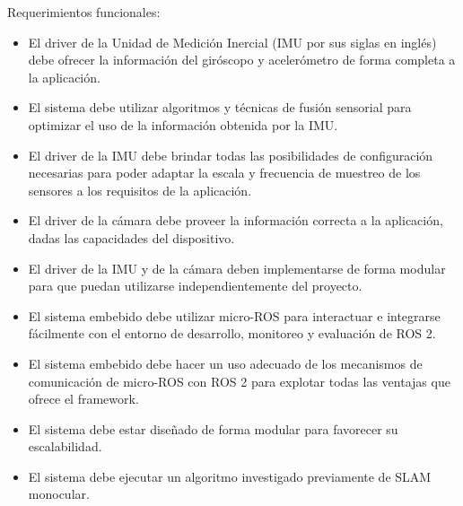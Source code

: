 \documentclass[
11pt, %
codirector, %
]{charter}
\begin{document}





Requerimientos funcionales:
\begin{itemize}
	\item El driver de la Unidad de Medición Inercial (IMU por sus siglas en inglés) debe ofrecer la información del giróscopo y acelerómetro de forma completa a la aplicación.
	\item El sistema debe utilizar algoritmos y técnicas de fusión sensorial para optimizar el uso de la información obtenida por la IMU.
	\item El driver de la IMU debe brindar todas las posibilidades de configuración necesarias para poder adaptar la escala y frecuencia de muestreo de los sensores a los requisitos de la aplicación.
	\item El driver de la cámara debe proveer la información correcta a la aplicación, dadas las capacidades del dispositivo.
	\item El driver de la IMU y de la cámara deben implementarse de forma modular para que puedan utilizarse independientemente del proyecto.
	\item El sistema embebido debe utilizar micro-ROS para interactuar e integrarse fácilmente con el entorno de desarrollo, monitoreo y evaluación de ROS 2.
	\item El sistema embebido debe hacer un uso adecuado de los mecanismos de comunicación de micro-ROS con ROS 2 para explotar todas las ventajas que ofrece el framework.
	\item El sistema debe estar diseñado de forma modular para favorecer su escalabilidad.
	\item El sistema debe ejecutar un algoritmo investigado previamente de SLAM monocular.
\end{itemize}
\end{document}
